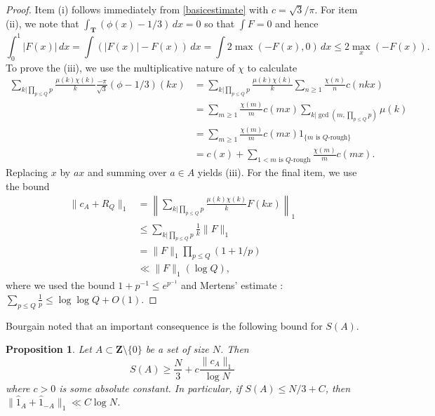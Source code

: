 \documentclass[11pt, reqno]{amsart}
\newtheorem{proposition}[theorem]{Proposition}
\begin{document}
\begin{proof}
    Item (i) follows immediately from \eqref{basicestimate} with $c=\sqrt{3}/\pi$. For item (ii), we note that $\int_\mathbf{T}(\phi(x)-1/3)\,dx=0$ so that $\int F=0$ and hence $$\int_0^1 |F(x)|\,dx=\int (|F(x)|-F(x))\,dx=\int 2\max(-F(x),0)\,dx\leqslant 2\max_x (-F(x)).$$
    To prove the (iii), we use the multiplicative nature of $\chi$ to calculate
    \begin{align*}
        \sum_{k|\prod_{p\leqslant Q}p}\frac{\mu(k)\chi(k)}{k}\frac{-\pi}{\sqrt{3}}(\phi-1/3)(kx)&=\sum_{k|\prod_{p\leqslant Q}p}\frac{\mu(k)\chi(k)}{k}\sum_{n\geqslant 1}\frac{\chi(n)}{n}c( nkx)\\
        &=\sum_{m\geqslant 1}\frac{\chi(m)}{m}c (mx)\sum_{k|\gcd(m,\prod_{p\leqslant Q}p)}\mu(k)\\
        &= \sum_{m\geqslant 1}\frac{\chi(m)}{m}c (mx) 1_{\{m \text{ is $Q$-rough}\}}\\
        &= c (x) +\sum_{1<m\text{ is $Q$-rough}}\frac{\chi(m)}{m}c( mx).
    \end{align*}
    Replacing $x$ by $ax$ and summing over $a\in A$ yields (iii). For the final item, we use the bound
    \begin{align*}
        \lVert c_A+R_Q\rVert_1&=\left\lVert \sum_{k|\prod_{p\leqslant Q}p}\frac{\mu(k)\chi(k)}{k}F(kx)\right\rVert_1\\
        &\leqslant \sum_{k|\prod_{p\leqslant Q}p}\frac{1}{k}\lVert F\rVert_1\\
        &=\lVert F\rVert_1\prod_{p\leqslant Q}(1+1/p)\\
        &\ll \lVert F\rVert_1(\log Q),
    \end{align*}
    where we used the bound $1+p^{-1}\leqslant e^{p^{-1}}$ and Mertens' estimate \cite[Theorem 2.7]{montgomeryvaughan}: $\sum_{p\leqslant Q}\frac{1}{p}\leqslant \log\log Q+O(1)$.
\end{proof}
Bourgain noted that an important consequence is the following bound for $S(A)$.
\begin{proposition}\label{prop:sumfreeL^1}
    Let $A\subset\mathbf{Z}\setminus\{0\}$ be a set of size $N$. Then
    \begin{equation}
        S(A)\geqslant \frac{N}{3}+c\frac{\lVert c_A\rVert_1}{\log N}
    \end{equation}
    where $c>0$ is some absolute constant. In particular, if $S(A)\leqslant N/3+C$, then $\lVert \hat{1}_A+\hat{1}_{-A}\rVert_1\ll C\log N$.
\end{proposition}
\end{document}
